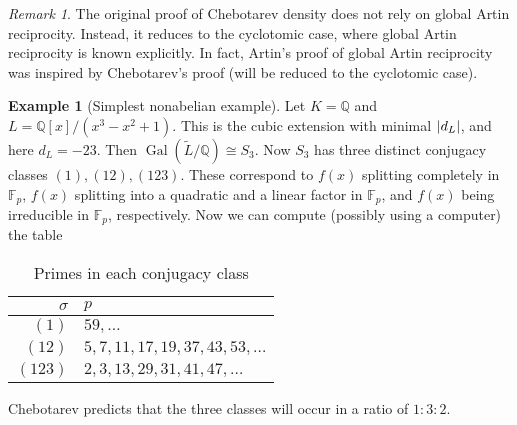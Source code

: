 \documentclass[leqno, openany]{memoir}
\theoremstyle{definition}
\newtheorem{exm}[thm]{Example}
\theoremstyle{remark}
\newtheorem{rmk}[thm]{Remark}
\theoremstyle{plain}
\theoremstyle{definition}
\theoremstyle{remark}
\newcommand{\F}{\mathbb{F}}
\newcommand{\Q}{\mathbb{Q}}
\newcommand{\wt}[1]{\widetilde{#1}}
\DeclareMathOperator{\Gal}{Gal}
\begin{document}
\begin{rmk} The original proof of Chebotarev density does not rely on global
    Artin reciprocity. Instead, it reduces to the cyclotomic case, where global
    Artin reciprocity is known explicitly. In fact, Artin's proof of global
    Artin reciprocity was inspired by Chebotarev's proof (will be reduced to
    the cyclotomic case).  \end{rmk}

\begin{exm}[Simplest nonabelian example] Let $K = \Q$ and $L = \Q[x] / (x^3 -
    x^2 + 1)$. This is the cubic extension with minimal $\abs{d_L}$, and here
    $d_L = -23$. Then $\Gal(\wt{L}/\Q) \cong S_3$. Now $S_3$ has three distinct
    conjugacy classes $(1), (12), (123)$. These correspond to $f(x)$ splitting
    completely in $\F_p$, $f(x)$ splitting into a quadratic and a linear factor
    in $\F_p$, and $f(x)$ being irreducible in $\F_p$, respectively. Now we can
    compute (possibly using a computer) the table \begin{table}[H] \centering
        \caption{Primes in each conjugacy class} \label{tab:label}
        \begin{tabular}{rl} \toprule $\sigma$ & $p$ \\ \midrule $(1)$ & $59,
            \ldots$ \\ $(12)$ & $5,7,11,17,19,37,43,53,\ldots$ \\ $(123)$ &
        $2,3,13,29,31,41,47,\ldots$ \\ \bottomrule \end{tabular} \end{table}
    Chebotarev predicts that the three classes will occur in a ratio of
$1:3:2$.  \end{exm}
\end{document}
